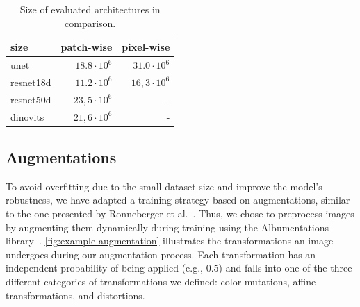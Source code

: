 \documentclass[10pt,conference,compsocconf]{IEEEtran}
\begin{document}
\begin{table}[ht!]
    \centering
    \begin{tabular}{l|r|r}
        \toprule
        size & patch-wise & pixel-wise \\
        \midrule
            unet        & $18.8 \cdot 10^6$ & $ 31.0 \cdot 10^6$ \\
            resnet18d   & $11.2 \cdot 10^6$ & $ 16,3 \cdot 10^6$\\
            resnet50d   & $23,5 \cdot 10^6$ & - \\
            dinovits    & $21,6 \cdot 10^6$ & - \\
        \bottomrule
    \end{tabular}
    \caption{Size of evaluated architectures in comparison.}
    \label{tab:arch_sizes}
\end{table}




\newpage
\subsection{Augmentations}
To avoid overfitting due to the small dataset size and improve the model's robustness, we have adapted a training strategy based on augmentations, similar to the one presented by Ronneberger et al.~\cite{unet}. Thus, we chose to preprocess images by augmenting them dynamically during training using the Albumentations library~\cite{albumentations}. \autoref{fig:example-augmentation} illustrates the transformations an image undergoes during our augmentation process. Each transformation has an independent probability of being applied (e.g., 0.5) and falls into one of the three different categories of transformations we defined: color mutations, affine transformations, and distortions.

\end{document}
